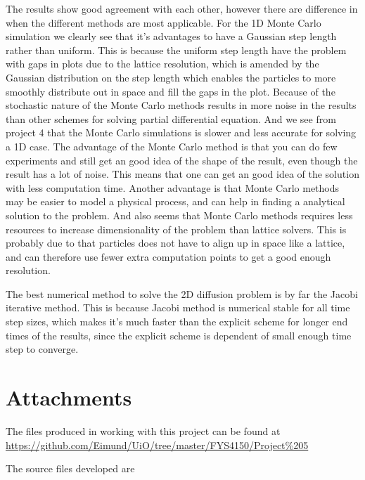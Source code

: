 \documentclass[11pt,english,a4paper]{article}
\begin{document}
\begin{flushleft}
The results show good agreement with each other, however there are difference in when the different methods are most applicable. For the 1D Monte Carlo simulation we clearly see that it's advantages to have a Gaussian step length rather than uniform. This is because the uniform step length have the problem with gaps in plots due to the lattice resolution, which is amended by the Gaussian distribution on the step length which enables the particles to more smoothly distribute out in space and fill the gaps in the plot. Because of the stochastic nature of the Monte Carlo methods results in more noise in the results than other schemes for solving partial differential equation. And we see from project 4 that the Monte Carlo simulations is slower and less accurate for solving a 1D case. The advantage of the Monte Carlo method is that you can do few experiments and still get an good idea of the shape of the result, even though the result has a lot of noise. This means that one can get an good idea of the solution with less computation time. Another advantage is that Monte Carlo methods may be easier to model a physical process, and can help in finding a analytical solution to the problem. And also seems that Monte Carlo methods requires less resources to increase dimensionality of the problem than lattice solvers. This is probably due to that particles does not have to align up in space like a lattice, and can therefore use fewer extra computation points to get a good enough resolution. \linebreak

The best numerical method to solve the 2D diffusion problem is by far the Jacobi iterative method. This is because Jacobi method is numerical stable for all time step sizes, which makes it's much faster than the explicit scheme for longer end times of the results, since the explicit scheme is dependent of small enough time step to converge. 
\newpage

\section{Attachments}

The files produced in working with this project can be found at  \href{https://github.com/Eimund/UiO/tree/master/FYS4150/Project\%205}{https://github.com/Eimund/UiO/tree/master/FYS4150/Project\%205}\linebreak

The source files developed are


\end{flushleft}
\end{document}
